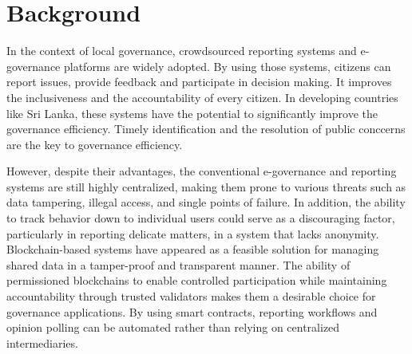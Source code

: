 


\section{Background}


In the context of local governance, crowdsourced reporting systems and e-governance platforms are widely adopted. By using those systems, citizens can report issues, provide feedback and participate in decision making. It improves the inclusiveness and the accountability of every citizen. In developing countries like Sri Lanka, these systems have the potential to significantly improve the governance efficiency. Timely identification and the resolution of public conccerns are the key to governance efficiency. 

However, despite their advantages, the conventional e-governance and reporting systems are still highly centralized, making them prone to various threats such as data tampering, illegal access, and single points of failure. In addition, the ability to track behavior down to individual users could serve as a discouraging factor, particularly in reporting delicate matters, in a system that lacks anonymity. Blockchain-based systems have appeared as a feasible solution for managing shared data in a tamper-proof and transparent manner. The ability of permissioned blockchains to enable controlled participation while maintaining accountability through trusted validators makes them a desirable choice for governance applications. By using smart contracts, reporting workflows and opinion polling can be automated rather than relying on centralized intermediaries. 


